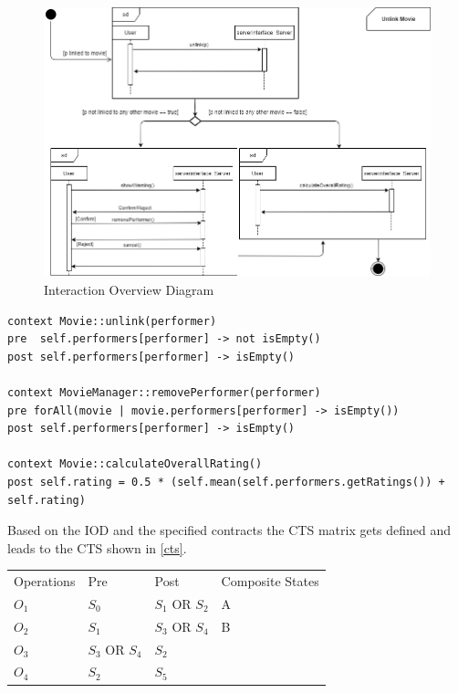 \begin{figure}[h]
	\centering
	\includegraphics[width=\textwidth]{img/iod.png}
	\caption{Interaction Overview Diagram}
	\label{iod}
\end{figure}

\begin{lstlisting}[caption={Contracts written in OCL},label={contracts2}]
context Movie::unlink(performer)
pre  self.performers[performer] -> not isEmpty()
post self.performers[performer] -> isEmpty()

context MovieManager::removePerformer(performer)
pre forAll(movie | movie.performers[performer] -> isEmpty())
post self.performers[performer] -> isEmpty()

context Movie::calculateOverallRating()
post self.rating = 0.5 * (self.mean(self.performers.getRatings()) + self.rating)
\end{lstlisting}

\newpage

Based on the IOD and the specified contracts the CTS matrix gets defined and leads to the CTS shown in \autoref{cts}.

\begin{longtable}[h]{llll}
	Operations & Pre & Post & Composite States \\
	$O_{1}$ & $S_{0}$ & $S_{1}$ OR $S_{2}$ & A \\
	$O_{2}$ & $S_{1}$ & $S_{3}$ OR $S_{4}$ & B \\
	$O_{3}$ & $S_{3}$ OR $S_{4}$ & $S_{2}$ & \\
	$O_{4}$ & $S_{2}$ & $S_{5}$ & \\
\end{longtable}


